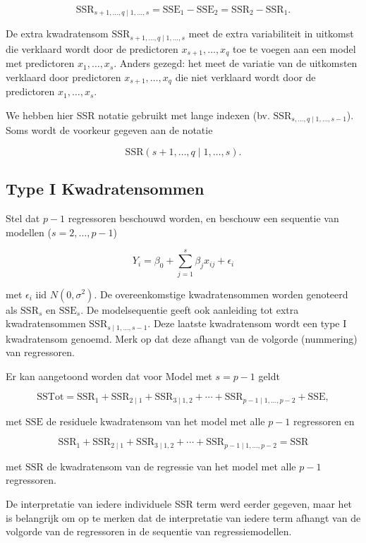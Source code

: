 \documentclass[
  12pt,dutch]{book}
\theoremstyle{definition}
\theoremstyle{definition}
\theoremstyle{definition}
\theoremstyle{definition}
\theoremstyle{remark}
\begin{document}
\[
  \text{SSR}_{s+1, \ldots, q\mid 1,\ldots, s} = \text{SSE}_1-\text{SSE}_2=\text{SSR}_2-\text{SSR}_1.
\]

De extra kwadratensom \(\text{SSR}_{s+1, \ldots, q\mid 1,\ldots, s}\) meet de extra variabiliteit in uitkomst die verklaard wordt door de predictoren \(x_{s+1}, \ldots, x_q\) toe te voegen aan een model met predictoren \(x_1,\ldots, x_{s}\).
Anders gezegd: het meet de variatie van de uitkomsten verklaard door predictoren \(x_{s+1}, \ldots, x_q\) die niet verklaard wordt door de predictoren \(x_1,\ldots, x_{s}\).

We hebben hier SSR notatie gebruikt met lange indexen (bv. \(\text{SSR}_{s, \ldots, q\mid 1,\ldots, s-1}\)). Soms wordt de voorkeur gegeven aan de notatie

\[
  \text{SSR}(s+1, \ldots, q\mid 1,\ldots, s).
\]

\subsection{Type I Kwadratensommen}\label{type-i-kwadratensommen}

Stel dat \(p-1\) regressoren beschouwd worden, en beschouw een sequentie van modellen (\(s=2,\ldots, p-1\))

\[
Y_i = \beta_0 + \sum_{j=1}^{s} \beta_j x_{ij} + \epsilon_i
\]

met \(\epsilon_i\text{ iid } N(0,\sigma^{2})\).
De overeenkomstige kwadratensommen worden genoteerd als \(\text{SSR}_{s}\) en \(\text{SSE}_{s}\). De modelsequentie geeft ook aanleiding tot extra kwadratensommen \(\text{SSR}_{s\mid 1,\ldots, s-1}\). Deze laatste kwadratensom wordt een type I kwadratensom genoemd. Merk op dat deze afhangt van de volgorde (nummering) van regressoren.

Er kan aangetoond worden dat voor Model met \(s=p-1\) geldt

\[
 \text{SSTot} = \text{SSR}_1 + \text{SSR}_{2\mid 1} + \text{SSR}_{3\mid 1,2} + \cdots + \text{SSR}_{p-1\mid 1,\ldots, p-2} + \text{SSE},
\]

met \(\text{SSE}\) de residuele kwadratensom van het model met alle \(p-1\) regressoren en

\[
  \text{SSR}_1 + \text{SSR}_{2\mid 1} + \text{SSR}_{3\mid 1,2} + \cdots + \text{SSR}_{p-1\mid 1,\ldots, p-2} = \text{SSR}
\]

met \(\text{SSR}\) de kwadratensom van de regressie van het model met alle \(p-1\) regressoren.

De interpretatie van iedere individuele SSR term werd eerder gegeven, maar het is belangrijk om op te merken dat de interpretatie van iedere term afhangt van de volgorde van de regressoren in de sequentie van regressiemodellen.
\end{document}
